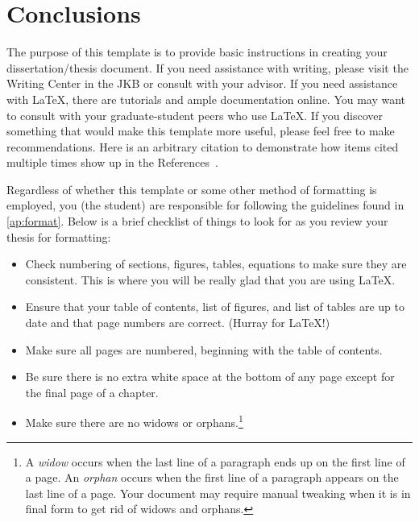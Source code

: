\chapter{Conclusions}

The purpose of this template is to provide basic instructions in creating your dissertation/thesis document. If you need assistance with writing, please visit the Writing Center in the JKB or consult with your advisor. If you need assistance with \LaTeX, there are tutorials and ample documentation online. You may want to consult with your graduate-student peers who use \LaTeX. If you discover something that would make this template more useful, please feel free to make recommendations. Here is an arbitrary citation to demonstrate how items cited multiple times show up in the References~.

Regardless of whether this template or some other method of formatting is employed, you (the student) are responsible for following the guidelines found in \cref{ap:format}. Below is a brief checklist of things to look for as you review your thesis for formatting:
\begin{itemize}
	\item Check numbering of sections, figures, tables, equations to make sure they are consistent.	This is where you will be really glad that you are using \LaTeX.
	\item Ensure that your table of contents, list of figures, and list of tables are up to date and that page numbers are correct. (Hurray for \LaTeX!)
	\item Make sure all pages are numbered, beginning with the table of contents.
	\item Be sure there is no extra white space at the bottom of any page except for the final page of a chapter.
	\item Make sure there are no widows or orphans.\footnote{A \emph{widow} occurs when the last line of a paragraph ends up on the first line of a page. An \emph{orphan} occurs when the first line of a paragraph appears on the last line of a page. Your document may require manual tweaking when it is in final form to get rid of widows and orphans.}
\end{itemize}
